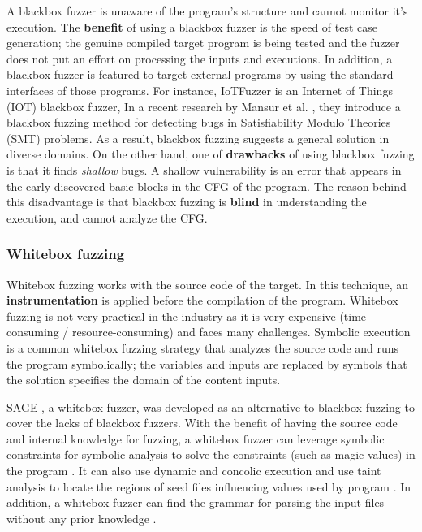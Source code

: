 A blackbox fuzzer is unaware of the program's structure and cannot monitor it's execution. The \textbf{benefit} of using a blackbox fuzzer is the speed of test case generation; the genuine compiled target program is being tested and the fuzzer does not put an effort on processing the inputs and executions. In addition, a blackbox fuzzer is featured to target external programs by using the standard interfaces of those programs. For instance, IoTFuzzer \cite{chen2018iotfuzzer} is an Internet of Things (IOT) blackbox fuzzer,  
In a recent research by Mansur et al. \cite{mansur2020detecting}, they introduce a blackbox fuzzing method for detecting bugs in Satisfiability Modulo Theories (SMT) problems. As a result, blackbox fuzzing suggests a general solution in diverse domains. On the other hand, one of \textbf{drawbacks} of using blackbox fuzzing is that it finds \textit{shallow} bugs. A shallow vulnerability is an error that appears in the early discovered basic blocks in the CFG of the program. The reason behind this disadvantage is that blackbox fuzzing is \textbf{blind} in understanding the execution, and cannot analyze the CFG.


\subsubsection{Whitebox fuzzing}
Whitebox fuzzing works with the source code of the target. In this technique, an \textbf{instrumentation} is applied before the compilation of the program. Whitebox fuzzing is not very practical in the industry as it is very expensive (time-consuming / resource-consuming) and faces many challenges. Symbolic execution \cite{king1976symbolic} is a common whitebox fuzzing strategy that analyzes the source code and runs the program symbolically; the variables and inputs are replaced by symbols that the solution specifies the domain of the content inputs. 

SAGE \cite{godefroid2012sage}, a whitebox fuzzer, was developed as an alternative to blackbox fuzzing to cover the lacks of blackbox fuzzers. With the benefit of having the source code and internal knowledge for fuzzing, a whitebox fuzzer can leverage symbolic constraints for symbolic analysis to solve the constraints (such as magic values) in the program \cite{cadar2011symbolic}. It can also use dynamic and concolic execution \cite{stephens2016driller} and use taint analysis to locate the regions of seed files influencing values used by program \cite{ganesh2009taint}. In addition, a whitebox fuzzer can find the grammar for parsing the input files without any prior knowledge \cite{godefroid2008grammar}.

